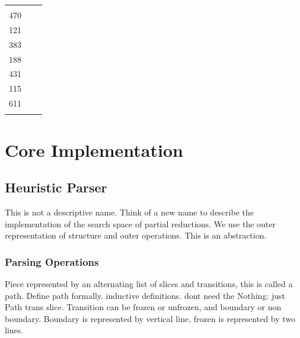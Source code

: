\documentclass[12pt,a4paper,twoside,openright]{report}
\theoremstyle{definition}
\begin{document}
\begin{table}[!t]
\begin{tabularx}{\textwidth}{l X c}
\begin{minipage}[t]{8cm}
  \end{minipage} & 
  \begin{minipage}[t]{0.5cm}
    2272
    \vspace{0.1\DTbaselineskip}\\
    470\\
    \vspace{\DTbaselineskip}
    121\\
    \vspace{\DTbaselineskip}
    383\\
    \vspace{1.8\DTbaselineskip}
    188\\
    \vspace{3.7\DTbaselineskip}
    431\\
    \vspace{3\DTbaselineskip}
    115\\
    \vspace{2.5\DTbaselineskip}
    611\\
  \end{minipage}
\end{tabularx}
\end{table}



\section{Core Implementation}

\subsection{Heuristic Parser}
This is not a descriptive name. Think of a new name to describe the implementation of the search space of partial reductions. We use the outer representation of structure and outer operations. This is an abstraction.

\subsubsection{Parsing Operations}
Piece represented by an alternating list of slices and transitions, this is called a path. Define path formally. inductive definitions. dont need the Nothing: just Path trans slice. Transition can be frozen or unfrozen, and boundary or non boundary. Boundary is represented by vertical line, frozen is represented by two lines.
\end{document}
